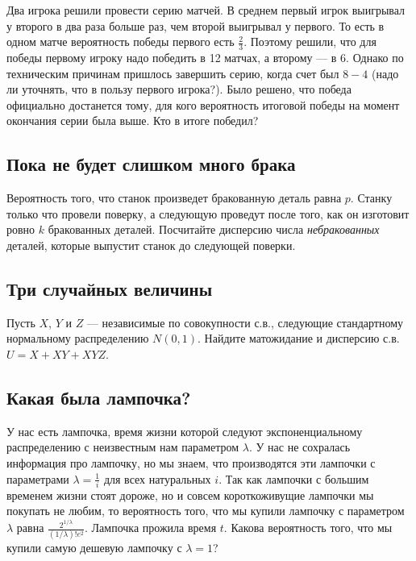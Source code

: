 \documentclass[12pt]{article}
\begin{document}
Два игрока решили провести серию матчей. В среднем первый игрок выигрывал у второго в два раза больше раз, чем второй выигрывал у первого. То есть в одном матче вероятность победы первого есть $\frac{2}{3}$. Поэтому решили, что для победы первому игроку надо победить в 12 матчах, а второму --- в 6. Однако по техническим причинам пришлось завершить серию, когда счет был $8-4$ (надо ли уточнять, что в пользу первого игрока?). Было решено, что победа официально достанется тому, для кого вероятность итоговой победы на момент окончания серии была выше. Кто в итоге победил?



\subsection{Пока не будет слишком много брака}

Вероятность того, что станок произведет бракованную деталь равна $p$. Станку только что провели поверку, а следующую проведут после того, как он изготовит ровно $k$ бракованных деталей. Посчитайте дисперсию числа \emph{небракованных} деталей, которые выпустит станок до следующей поверки.



\subsection{Три случайных величины}

Пусть $X$, $Y$ и $Z$ --- независимые по совокупности с.в., следующие стандартному нормальному распределению $N(0, 1)$. Найдите матожидание и дисперсию с.в. $U = X + XY + XYZ$. 



\subsection{Какая была лампочка?}

У нас есть лампочка, время жизни которой следуют экспоненциальному распределению с неизвестным нам параметром $\lambda$. У нас не сохралась информация про лампочку, но мы знаем, что производятся эти лампочки с параметрами $\lambda = \frac{1}{i}$ для всех натуральных $i$. Так как лампочки с большим временем жизни стоят дороже, но и совсем короткоживущие лампочки мы покупать не любим, то вероятность того, что мы купили лампочку с параметром $\lambda$ равна $\frac{2^{1/\lambda}}{(1/\lambda)!e^2}$. Лампочка прожила время $t$. Какова вероятность того, что мы купили самую дешевую лампочку с $\lambda = 1$?
\end{document}
